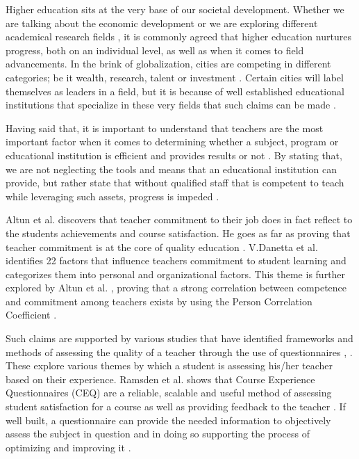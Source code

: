 \documentclass[twocolumn]{article}
\begin{document}
Higher education sits at the very base of our societal development. Whether we are talking about the economic development \cite{Lin2004} or we are exploring different academical research fields \cite{Jones}, it is commonly agreed that higher education nurtures progress, both on an individual level, as well as when it comes to field advancements. In the brink of globalization, cities are competing in different categories; be it wealth, research, talent or investment \cite{Caniels2011}. Certain cities will label themselves as leaders in a field, but it is because of well established educational institutions that specialize in these very fields that such claims can be made \cite{Caniels2011}.

Having said that, it is important to understand that teachers are the most important factor when it comes to determining whether a subject, program or educational institution is efficient and provides results or not \cite{Hattie}. By stating that, we are not neglecting the tools and means that an educational institution can provide, but rather state that without qualified staff that is competent to teach while leveraging such assets, progress is impeded \cite{guyana}.

Altun et al. discovers that teacher commitment to their job does in fact reflect to the students achievements and course satisfaction. He goes as far as proving that teacher commitment is at the core of quality education \cite{Altun2017}. V.Danetta et al. identifies 22 factors that influence teachers commitment to student learning \cite{Dannetta2002} and categorizes them into personal and organizational factors. This theme is further explored by Altun et al. \cite{Altun2017}, proving that a strong correlation between competence and commitment among teachers exists by using the Person Correlation Coefficient \cite{Akram}.

Such claims are supported by various studies that have identified frameworks and methods of assessing the quality of a teacher through the use of questionnaires \cite{Ramsden1991}, \cite{Kember2009}. These explore various themes by which a student is assessing his/her teacher based on their experience. Ramsden et al. shows that Course Experience Questionnaires (CEQ) are a reliable, scalable and useful method of assessing student satisfaction for a course as well as providing feedback to the teacher \cite{Ramsden1991}. If well built, a questionnaire can provide the needed information to objectively assess the subject in question and in doing so supporting the process of optimizing and improving it \cite{Kember2009}.
\end{document}
